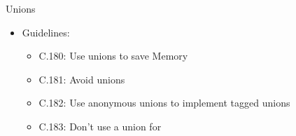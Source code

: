 \begin{frame}[t]{Unions}
\begin{itemize}
  \item Guidelines:
    \begin{itemize}
      \item C.180: Use unions to save Memory
      \item C.181: Avoid  unions
      \item C.182: Use anonymous unions to implement tagged unions
      \item C.183: Don’t use a union for 
    \end{itemize}
\end{itemize}
\end{frame}

